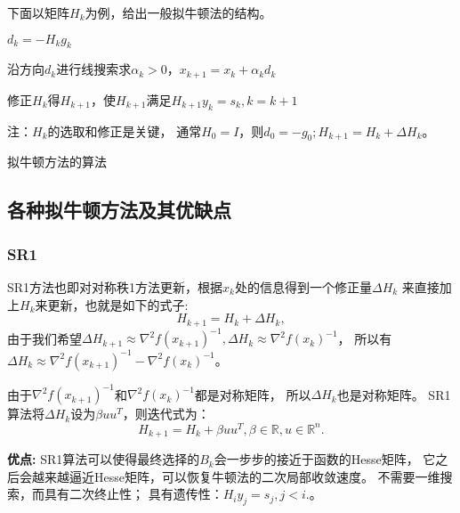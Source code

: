         下面以矩阵$H_k$为例，给出一般拟牛顿法的结构。             
        \begin{algorithm}
            \SetAlgoLined

             {
                $d_k=-H_kg_k$
                
                沿方向$d_k$进行线搜索求$\alpha_k>0$，$x_{k+1}=x_k+\alpha_kd_k$
                
                修正$H_k$得$H_{k+1}$，使$H_{k+1}$满足$H_{k+1}y_k=s_k,k=k+1$
            }
            
            注：$H_k$的选取和修正是关键，
            通常$H_0=I$，则$d_0=-g_0;H_{k+1}=H_k+\Delta H_k$。
            \caption{拟牛顿方法的算法}
        \end{algorithm}
        
\subsection{各种拟牛顿方法及其优缺点}
\subsubsection{SR1}
    SR1方法\cite{1980Curvilinear}也即对对称秩1方法更新，根据$x_k$处的信息得到一个修正量$\Delta H_k$
    来直接加上$H_k$来更新，也就是如下的式子:
    \begin{equation}
        H_{k+1} = H_k + \Delta H_k,
        \nonumber
    \end{equation}
    由于我们希望$\Delta H_{k+1} \approx \nabla^2f(x_{k+1})^{-1},
                    \Delta H_{k} \approx \nabla^2f(x_k)^{-1}$，
    所以有$\Delta H_k \approx \nabla^2f(x_{k+1})^{-1}-\nabla^2f(x_k)^{-1}$。

    由于$\nabla^2f(x_{k+1})^{-1}$和$\nabla^2f(x_k)^{-1}$都是对称矩阵，
    所以$\Delta H_k$也是对称矩阵。
    SR1算法将$\Delta H_k$设为$\beta uu^T$，则迭代式为：
    \begin{equation}
        H_{k+1} = H_{k} + \beta uu^T, \beta\in \mathbb{R}, u \in \mathbb{R}^{n}.
    \nonumber
    \end{equation}
    
    \textbf{优点:}
        SR1算法可以使得最终选择的$B_k$会一步步的接近于函数的Hesse矩阵，
        它之后会越来越逼近Hesse矩阵，可以恢复牛顿法的二次局部收敛速度。
        不需要一维搜索，而具有二次终止性；
        具有遗传性：$H_iy_j=s_j,j<i.$。
    
